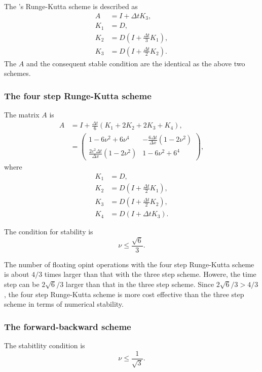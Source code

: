 The \citet{Wicker_Skamarock_2002}'s Runge-Kutta scheme is described as
\begin{align}
  A &= I + \Delta t K_3, \\
  K_1 &= D, \\
  K_2 &= D \left(I + \frac{\Delta t}{3}K_1\right), \\
  K_3 &= D \left(I + \frac{\Delta t}{2}K_2\right).
\end{align}
The $A$ and the consequent stable condition are the identical as the above two schemes.


\subsubsection{The four step Runge-Kutta scheme}
The matrix $A$ is
\begin{align}
  A &= I + \frac{\Delta t}{6}(K_1 + 2K_2 + 2K_3 + K_4), \\
  &= \begin{pmatrix}
    1-6\nu^2+6\nu^4 & -\frac{6\Delta t}{\Delta x}(1-2\nu^2) \\
    \frac{2c^2\Delta t}{\Delta x}(1-2\nu^2) & 1-6\nu^2+6^4
  \end{pmatrix},
\end{align}
where
\begin{align}
  K_1 &= D, \\
  K_2 &= D \left(I + \frac{\Delta t}{2}K_1\right), \\
  K_3 &= D \left(I + \frac{\Delta t}{2}K_2\right), \\
  K_4 &= D (I + \Delta t K_3).
\end{align}

The condition for stability is
\begin{equation}
  \nu \le \frac{\sqrt{6}}{3}.
\end{equation}

The number of floating opint operations with the four step Runge-Kutta scheme is about $4/3$ times larger than that with the three step scheme.
Howere, the time step can be $2\sqrt{6}/3$ larger than that in the three step scheme.
Since $2\sqrt{6}/3 > 4/3$, the four step Runge-Kutta scheme is more cost effective than the three step scheme in terms of numerical stability.


\subsubsection{The forward-backward scheme}
The stabitlity condition is
\begin{equation}
  \nu \le \frac{1}{\sqrt{3}}.
\end{equation}

